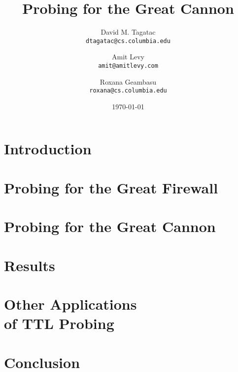\documentclass[10pt,twocolumn]{article}
\begin{document}
\title{\bf Probing for the Great Cannon}
\author{
	David M. Tagatac\\
	\texttt{dtagatac@cs.columbia.edu}
	\and
	Amit Levy\\
	\texttt{amit@amitlevy.com}
	\and
	Roxana Geambasu\\
	\texttt{roxana@cs.columbia.edu}
}
\date{\today}
\maketitle
\thispagestyle{empty}

%

\section{Introduction}


\section{Probing for the Great Firewall}


\section{Probing for the Great Cannon}


\section{Results}\label{results}


\section{Other Applications\\of TTL Probing}


\section{Conclusion}


{\footnotesize 
}
\end{document}

